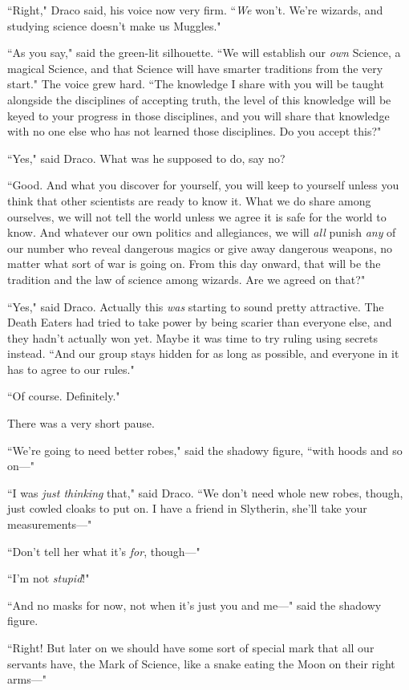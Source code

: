 ``Right," Draco said, his voice now very firm. ``\emph{We} won't. We're wizards, and studying science doesn't make us Muggles."

``As you say," said the green-lit silhouette. ``We will establish our \emph{own} Science, a magical Science, and that Science will have smarter traditions from the very start." The voice grew hard. ``The knowledge I share with you will be taught alongside the disciplines of accepting truth, the level of this knowledge will be keyed to your progress in those disciplines, and you will share that knowledge with no one else who has not learned those disciplines. Do you accept this?"

``Yes," said Draco. What was he supposed to do, say no?

``Good. And what you discover for yourself, you will keep to yourself unless you think that other scientists are ready to know it. What we do share among ourselves, we will not tell the world unless we agree it is safe for the world to know. And whatever our own politics and allegiances, we will \emph{all} punish \emph{any} of our number who reveal dangerous magics or give away dangerous weapons, no matter what sort of war is going on. From this day onward, that will be the tradition and the law of science among wizards. Are we agreed on that?"

``Yes," said Draco. Actually this \emph{was} starting to sound pretty attractive. The Death Eaters had tried to take power by being scarier than everyone else, and they hadn't actually won yet. Maybe it was time to try ruling using secrets instead. ``And our group stays hidden for as long as possible, and everyone in it has to agree to our rules."

``Of course. Definitely."

There was a very short pause.

``We're going to need better robes," said the shadowy figure, ``with hoods and so on—"

``I was \emph{just thinking} that," said Draco. ``We don't need whole new robes, though, just cowled cloaks to put on. I have a friend in Slytherin, she'll take your measurements—"

``Don't tell her what it's \emph{for}, though—"

``I'm not \emph{stupid}!"

``And no masks for now, not when it's just you and me—" said the shadowy figure.

``Right! But later on we should have some sort of special mark that all our servants have, the Mark of Science, like a snake eating the Moon on their right arms—"

